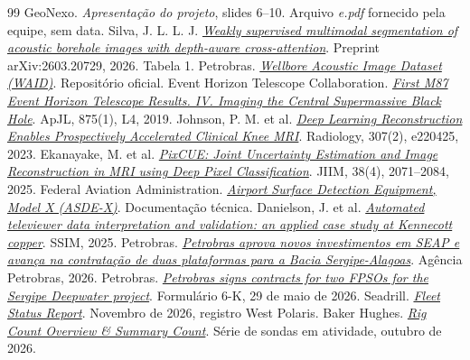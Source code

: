 \documentclass[11pt,a4paper]{article}
\begin{document}
\small
\begin{thebibliography}{99}
\setlength{\itemsep}{1pt}
\setlength{\parsep}{0pt}
 GeoNexo. \textit{Apresentação do projeto}, slides 6--10. Arquivo \textit{e.pdf} fornecido pela equipe, sem data.
 Silva, J. L. L. J. \href{https://arxiv.org/html/2603.20729v1}{\textit{Weakly supervised multimodal segmentation of acoustic borehole images with depth-aware cross-attention}}. Preprint arXiv:2603.20729, 2026. Tabela 1.
 Petrobras. \href{https://github.com/petrobras/waid}{\textit{Wellbore Acoustic Image Dataset (WAID)}}. Repositório oficial.
 Event Horizon Telescope Collaboration. \href{https://doi.org/10.3847/2041-8213/ab0e85}{\textit{First M87 Event Horizon Telescope Results. IV. Imaging the Central Supermassive Black Hole}}. ApJL, 875(1), L4, 2019.
 Johnson, P. M. et al. \href{https://doi.org/10.1148/radiol.220425}{\textit{Deep Learning Reconstruction Enables Prospectively Accelerated Clinical Knee MRI}}. Radiology, 307(2), e220425, 2023.
 Ekanayake, M. et al. \href{https://doi.org/10.1007/s10278-024-01250-3}{\textit{PixCUE: Joint Uncertainty Estimation and Image Reconstruction in MRI using Deep Pixel Classification}}. JIIM, 38(4), 2071--2084, 2025.
 Federal Aviation Administration. \href{https://www.faa.gov/air_traffic/technology/asde-x}{\textit{Airport Surface Detection Equipment, Model X (ASDE-X)}}. Documentação técnica.
 Danielson, J. et al. \href{https://doi.org/10.36487/ACG_repo/2535_48}{\textit{Automated televiewer data interpretation and validation: an applied case study at Kennecott copper}}. SSIM, 2025.
 Petrobras. \href{https://agencia.petrobras.com.br/w/negocio/petrobras-aprova-novos-investimentos-em-seap-e-avan%C3%A7a-na-contrata%C3%A7%C3%A3o-de-duas-plataformas-para-a-bacia-sergipe-alagoas}{\textit{Petrobras aprova novos investimentos em SEAP e avança na contratação de duas plataformas para a Bacia Sergipe-Alagoas}}. Agência Petrobras, 2026.
 Petrobras. \href{https://www.sec.gov/Archives/edgar/data/1119639/000129281426003241/pbr20260529_6k.htm}{\textit{Petrobras signs contracts for two FPSOs for the Sergipe Deepwater project}}. Formulário 6-K, 29 de maio de 2026.
 Seadrill. \href{https://www.seadrill.com/wp-content/uploads/2026/11/Seadrill-Fleet-Status-Report-November-2026-vF.pdf}{\textit{Fleet Status Report}}. Novembro de 2026, registro West Polaris.
 Baker Hughes. \href{https://rigcount.bakerhughes.com/}{\textit{Rig Count Overview \& Summary Count}}. Série de sondas em atividade, outubro de 2026.
\end{thebibliography}
\end{document}
